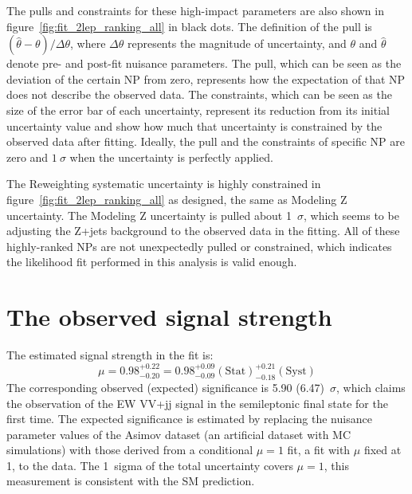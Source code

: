 The pulls and constraints for these high-impact parameters are also shown in figure~\ref{fig:fit_2lep_ranking_all} in black dots.
The definition of the pull is $(\hat{\theta}-\theta) / \Delta \theta$, where $\Delta \theta$ represents the magnitude of uncertainty, and $\theta$ and $\hat{\theta}$ denote pre- and post-fit nuisance parameters.
The pull, which can be seen as the deviation of the certain NP from zero, represents how the expectation of that NP does not describe the observed data.
The constraints, which can be seen as the size of the error bar of each uncertainty, represent its reduction from its initial uncertainty value and show how much that uncertainty is constrained by the observed data after fitting.
Ideally, the pull and the constraints of specific NP are zero and $1~\sigma$ when the uncertainty is perfectly applied.

The Reweighting systematic uncertainty is highly constrained in figure~\ref{fig:fit_2lep_ranking_all} as designed, the same as Modeling Z uncertainty. 
The Modeling Z uncertainty is pulled about 1~$\sigma$, which seems to be adjusting the Z+jets background to the observed data in the fitting.
All of these highly-ranked NPs are not unexpectedly pulled or constrained, which indicates the likelihood fit performed in this analysis is valid enough.

\section{The observed signal strength}
\label{sec:mu}
The estimated signal strength in the fit is:
\begin{equation}
    \mu = 0.98^{+ 0.22}_{- 0.20} = 0.98^{+ 0.09}_{- 0.09}(\mathrm{Stat})^{+ 0.21}_{- 0.18}(\mathrm{Syst}) 
\end{equation}
The corresponding observed (expected) significance is 5.90 (6.47)~$\sigma$, which claims the observation of the EW VV+jj signal in the semileptonic final state for the first time. 
The expected significance is estimated by replacing the nuisance parameter values of the Asimov dataset (an artificial dataset with MC simulations) with those derived from a conditional $\mu = 1$ fit, a fit with $\mu$ fixed at 1, to the data. 
The 1~sigma of the total uncertainty covers $\mu = 1$, this measurement is consistent with the SM prediction.

